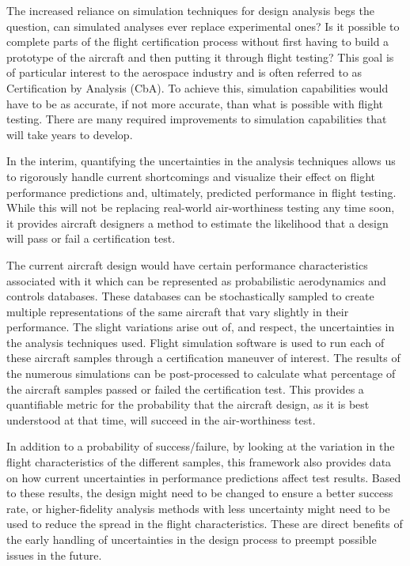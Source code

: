 The increased reliance on simulation techniques for design analysis begs the question, can simulated analyses ever replace experimental ones?
Is it possible to complete parts of the flight certification process without first having to build a prototype of the aircraft and then putting it through flight testing?
This goal is of particular interest to the aerospace industry and is often referred to as Certification by Analysis (CbA).
To achieve this, simulation capabilities would have to be as accurate, if not more accurate, than what is possible with flight testing.  
There are many required improvements to simulation capabilities \cite{slotnick_cfd_nodate} that will take years to develop.

In the interim, quantifying the uncertainties in the analysis techniques allows us to rigorously handle current shortcomings and visualize their effect on flight performance predictions and, ultimately, predicted performance in flight testing.
While this will not be replacing real-world air-worthiness testing any time soon, it provides aircraft designers a method to estimate the likelihood that a design will pass or fail a certification test. 

The current aircraft design would have certain performance characteristics associated with it which can be represented as probabilistic aerodynamics and controls databases. 
These databases can be stochastically sampled to create multiple representations of the same aircraft that vary slightly in their performance.
The slight variations arise out of, and respect, the uncertainties in the analysis techniques used. 
Flight simulation software is used to run each of these aircraft samples through a certification maneuver of interest.
The results of the numerous simulations can be post-processed to calculate what percentage of the aircraft samples passed or failed the certification test.
This provides a quantifiable metric for the probability that the aircraft design, as it is best understood at that time, will succeed in the air-worthiness test.

In addition to a probability of success/failure, by looking at the variation in the flight characteristics of the different samples, this framework also provides data on how current uncertainties in performance predictions affect test results.
Based to these results, the design might need to be changed to ensure a better success rate, or higher-fidelity analysis methods with less uncertainty might need to be used to reduce the spread in the flight characteristics. 
These are direct benefits of the early handling of uncertainties in the design process to preempt possible issues in the future. 

